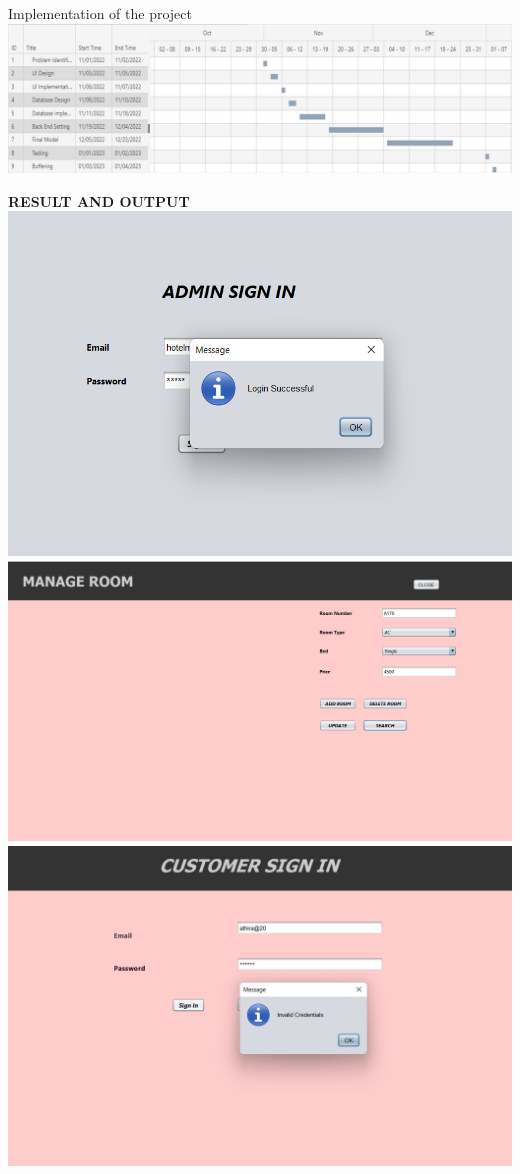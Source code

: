 \documentclass[a4paper,12pt]{report}
\begin{document}
Implementation of the project 
\\
\includegraphics[scale=0.75]{gantt.png}
\begin{flushleft}
		\textbf{RESULT AND OUTPUT}
  \\
  \includegraphics[scale=0.45]{o1.png}
  \includegraphics[scale=0.42]{o2.png}
  \includegraphics[scale=0.39]{o3.png}

\end{flushleft}
\end{document}
